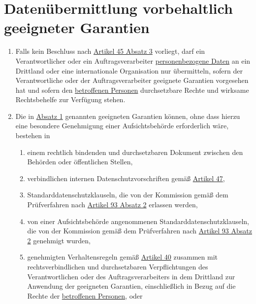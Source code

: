 \chapter{Datenübermittlung vorbehaltlich geeigneter Garantien}
\label{ch:46}


\begin{enumerate}

  \item Falls kein Beschluss nach \hyperref[itm:45-3]{Artikel 45 Absatz 3} vorliegt, darf ein Verantwortlicher oder ein
   Auftragsverarbeiter \hyperref[itm:04-1]{personenbezogene Daten} an ein Drittland oder eine internationale Organisation nur übermitteln,
   sofern der Verantwortliche oder der Auftragsverarbeiter geeignete Garantien vorgesehen hat und sofern den
   \hyperref[itm:04-1]{betroffenen Personen} durchsetzbare Rechte und wirksame Rechtsbehelfe zur Verfügung stehen.
  \label{itm:46-1}

  \item Die in \hyperref[itm:46-1]{Absatz 1} genannten geeigneten Garantien können, ohne dass hierzu eine besondere
   Genehmigung einer Aufsichtsbehörde erforderlich wäre, bestehen in
  \label{itm:46-2}

  \begin{enumerate}
  
    \item einem rechtlich bindenden und durchsetzbaren Dokument zwischen den Behörden oder öffentlichen Stellen,
    \label{itm:46-2a}

    \item verbindlichen internen Datenschutzvorschriften gemäß \hyperref[ch:47]{Artikel 47},
    \label{itm:46-2b}

    \item Standarddatenschutzklauseln, die von der Kommission gemäß dem Prüfverfahren nach \hyperref[itm:93-2]
     {Artikel 93 Absatz 2} erlassen werden,
    \label{itm:46-2c}

    \item von einer Aufsichtsbehörde angenommenen Standarddatenschutzklauseln, die von der Kommission gemäß dem
     Prüfverfahren nach \hyperref[itm:93-2]{Artikel 93 Absatz 2} genehmigt wurden,
    \label{itm:46-2d}

    \item genehmigten Verhaltensregeln gemäß \hyperref[ch:40]{Artikel 40} zusammen mit rechtsverbindlichen und
     durchsetzbaren Verpflichtungen des Verantwortlichen oder des Auftragsverarbeiters in dem Drittland zur Anwendung
     der geeigneten Garantien, einschließlich in Bezug auf die Rechte der \hyperref[itm:04-1]{betroffenen Personen}, oder
    \label{itm:46-2e}


\end{enumerate}
\end{enumerate}
